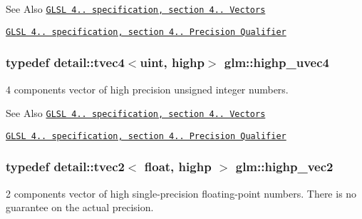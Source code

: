 \begin{DoxySeeAlso}{See Also}
\href{http://www.opengl.org/registry/doc/GLSLangSpec.4.20.8.pdf}{\tt G\-L\-S\-L 4.. specification, section 4.. Vectors} 

\href{http://www.opengl.org/registry/doc/GLSLangSpec.4.20.8.pdf}{\tt G\-L\-S\-L 4.. specification, section 4.. Precision Qualifier} 
\end{DoxySeeAlso}
\hypertarget{group__core__precision_ga7cb8cc501f7e680e1889b93eb80e6c46}{
\subsubsection[{highp\-\_\-uvec4}]{\setlength{\rightskip}{0pt plus 5cm}typedef detail\-::tvec4$<$uint, highp$>$ {\bf glm\-::highp\-\_\-uvec4}}}\label{group__core__precision_ga7cb8cc501f7e680e1889b93eb80e6c46}
4 components vector of high precision unsigned integer numbers.

\begin{DoxySeeAlso}{See Also}
\href{http://www.opengl.org/registry/doc/GLSLangSpec.4.20.8.pdf}{\tt G\-L\-S\-L 4.. specification, section 4.. Vectors} 

\href{http://www.opengl.org/registry/doc/GLSLangSpec.4.20.8.pdf}{\tt G\-L\-S\-L 4.. specification, section 4.. Precision Qualifier} 
\end{DoxySeeAlso}
\hypertarget{group__core__precision_ga37645abcfcc1278567e99f1ca492bfbb}{
\subsubsection[{highp\-\_\-vec2}]{\setlength{\rightskip}{0pt plus 5cm}typedef detail\-::tvec2$<$ float, highp $>$ {\bf glm\-::highp\-\_\-vec2}}}\label{group__core__precision_ga37645abcfcc1278567e99f1ca492bfbb}
2 components vector of high single-\/precision floating-\/point numbers. There is no guarantee on the actual precision.

